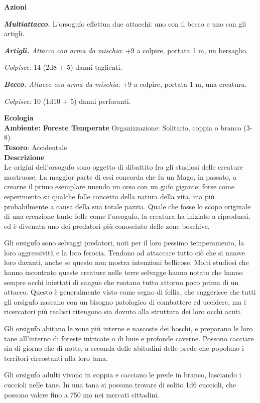 \begin{multicols}{2}
\textbf{Azioni}

\textit{\textbf{Multiattacco.}} L'orsogufo effettua due attacchi: uno con il becco e uno con gli artigli.

\textit{\textbf{Artigli.} Attacco con arma da mischia}: +9 a colpire, portata 1 m, un bersaglio.

\textit{Colpisce:} 14 (2d8 + 5) danni taglienti.

\textit{\textbf{Becco.} Attacco con arma da mischia}: +9 a colpire, portata 1 m, una creatura.

\textit{Colpisce:} 10 (1d10 + 5) danni perforanti.

\textbf{Ecologia}\\
\textbf{Ambiente: Foreste Temperate}
Organizzazione: Solitario, coppia o branco (3-8)\\
\textbf{Tesoro}: Accidentale\\
\textbf{Descrizione}\\
Le origini dell'orsogufo sono oggetto di dibattito fra gli studiosi delle creature mostruose. La maggior parte di essi concorda che fu un Mago, in passato, a crearne il primo esemplare unendo un orso con un gufo gigante; forse come esperimento su qualche folle concetto della natura della vita, ma più probabilmente a causa della sua totale pazzia. Quale che fosse lo scopo originale di una creazione tanto folle come l'orsogufo, la creatura ha iniziato a riprodursi, ed è divenuta uno dei predatori più conosciuto delle zone boschive.

Gli orsigufo sono selvaggi predatori, noti per il loro pessimo temperamento, la loro aggressività e la loro ferocia. Tendono ad attaccare tutto ciò che si muove loro davanti, anche se questo non mostra intenzioni bellicose. Molti studiosi che hanno incontrato queste creature nelle terre selvagge hanno notato che hanno sempre occhi iniettati di sangue che ruotano tutto attorno poco prima di un attacco. Questo è generalmente visto come segno di follia, che suggerisce che tutti gli orsigufo nascano con un bisogno patologico di combattere ed uccidere, ma i ricercatori più realisti ritengono sia dovuto alla struttura dei loro occhi acuti.

Gli orsigufo abitano le zone più interne e nascoste dei boschi, e preparano le loro tane all'interno di foreste intricate o di buie e profonde caverne. Possono cacciare sia di giorno che di notte, a seconda delle abitudini delle prede che popolano i territori circostanti alla loro tana.

Gli orsigufo adulti vivono in coppia e cacciano le prede in branco, lasciando i cuccioli nelle tane. In una tana si possono trovare di solito 1d6 cuccioli, che possono valere fino a 750 mo nei mercati cittadini.


\end{multicols}
